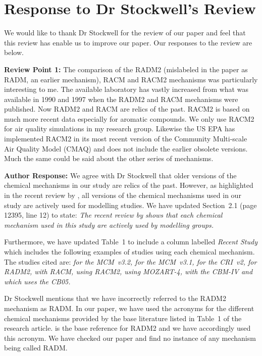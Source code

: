 \documentclass{article}
\begin{document}
\section*{Response to Dr Stockwell's Review}

We would like to thank Dr Stockwell for the review of our paper and feel that this review has enable us to improve our paper.
Our responses to the review are below.

\textbf{Review Point 1: } The comparison of the RADM2 (mislabeled in the paper as RADM, an earlier mechanism), RACM and RACM2 mechanisms was particularly interesting to me. The available laboratory has vastly increased from what was available in 1990 and 1997 when the RADM2 and RACM mechanisms were published. Now RADM2 and RACM are relics of the past. RACM2 is based on much more recent data especially for aromatic compounds. We only use RACM2 for air quality simulations in my research group.  Likewise the US EPA has implemented RACM2 in its most recent version of the Community Multi-scale Air Quality Model (CMAQ) and does not include the earlier obsolete versions. Much the same could be said about the other series of mechanisms.

\textbf{Author Response:} We agree with Dr Stockwell that older versions of the chemical mechanisms in our study are relics of the past.
However, as highlighted in the recent review by \citet{Baklanov:2014}, all versions of the chemical mechanisms used in our study are actively used for modelling studies.
We have updated Section~2.1 (page 12395, line 12) to state:
\textit{The recent review by \citet{Baklanov:2014} shows that each chemical mechanism used in this study are actively used by modelling groups.}

Furthermore, we have updated Table~1 to include a column labelled \textit{Recent Study} which includes the following examples of studies using each chemical mechanism. 
The studies cited are:
\textit{\citet{Koss:2015} for the MCM~v3.2, \citet{Lidster:2014} for the MCM~v3.1, \citet{Derwent:2015} for the CRI~v2, \citet{Li:2014} for RADM2, \citet{Ahmadov:2015} with RACM, \citet{Goliff:2015} using RACM2, \citet{Hou:2015} using MOZART-4, \citet{Foster:2014} with the CBM-IV and \citet{Dunker:2015} which uses the CB05.}

Dr Stockwell mentions that we have incorrectly referred to the RADM2 mechanism as RADM.
In our paper, we have used the acronyms for the different chemical mechanisms provided by the base literature listed in Table~1 of the research article.
\citet{Stockwell:1990} is the base reference for RADM2 and we have accordingly used this acronym.
We have checked our paper and find no instance of any mechanism being called RADM.
\end{document}
